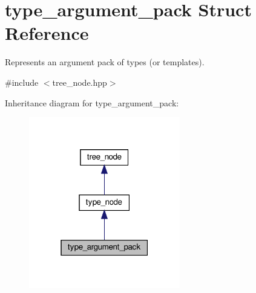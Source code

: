 \hypertarget{structtype__argument__pack}{}\section{type\+\_\+argument\+\_\+pack Struct Reference}
\label{structtype__argument__pack}


Represents an argument pack of types (or templates).  




{\ttfamily \#include $<$tree\+\_\+node.\+hpp$>$}



Inheritance diagram for type\+\_\+argument\+\_\+pack\+:
\nopagebreak
\begin{figure}[H]
\begin{center}
\leavevmode
\includegraphics[width=187pt]{da/d0d/structtype__argument__pack__inherit__graph}
\end{center}
\end{figure}


